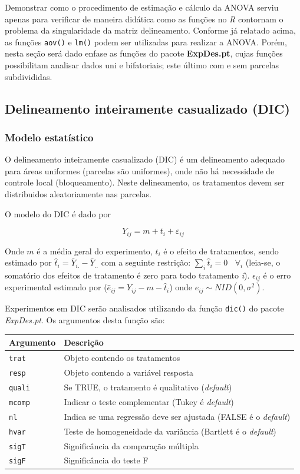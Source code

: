\documentclass[
]{book}
\numberwithin{equation}{section}
\newcommand{\indt}[1]{\index{#1|ST}}
\begin{document}
Demonstrar como o procedimento de estimação e cálculo da ANOVA serviu apenas para verificar de maneira didática como as funções no \emph{R} contornam o problema da singularidade da matriz delineamento. Conforme já relatado acima, as funções \texttt{aov()} e \texttt{lm()} podem ser utilizadas para realizar a ANOVA. Porém, nesta seção será dado enfase as funções do pacote \textbf{ExpDes.pt}, \indt{ExpDes} cujas funções possibilitam analisar dados uni e bifatoriais; este último com e sem parcelas subdivididas.

\hypertarget{delineamento-inteiramente-casualizado-dic}{%
\subsection{Delineamento inteiramente casualizado (DIC)}\label{delineamento-inteiramente-casualizado-dic}}

\hypertarget{modelo-estatuxedstico}{%
\subsubsection{Modelo estatístico}\label{modelo-estatuxedstico}}

O delineamento inteiramente casualizado (DIC) é um delineamento adequado para áreas uniformes (parcelas são uniformes), onde não há necessidade de controle local (bloqueamento). Neste delineamento, os tratamentos devem ser distribuidos aleatoriamente nas parcelas.

O modelo do DIC é dado por \indt{DIC}

\[
{Y_{ij}} = m + {t_i} + {\varepsilon _{ij}}
\]

Onde \(m\) é a média geral do experimento, \(t_i\) é o efeito de tratamentos, sendo estimado por \(\hat t_i = \bar Y_{i.} - \bar Y_{..}\) com a seguinte restrição: \(\sum_i \hat t_i = 0 ~~~~\forall_i\) (leia-se, o somatório dos efeitos de tratamento é zero para todo tratamento \emph{i}). \(\epsilon_{ij}\) é o erro experimental estimado por (\(\hat e_{ij} = Y_{ij} - m - \hat t_i\)) onde \({e_{ij}}\sim NID(0,{\sigma ^2})\).

Experimentos em DIC serão analisados utilizando da função \texttt{dic()} \indt{dic()} do pacote \emph{ExpDes.pt}. Os argumentos desta função são:

\begin{longtable}[]{@{}ll@{}}
\toprule
Argumento & Descrição\tabularnewline
\midrule
\endhead
\texttt{trat} & Objeto contendo os tratamentos\tabularnewline
\texttt{resp} & Objeto contendo a variável resposta\tabularnewline
\texttt{quali} & Se TRUE, o tratamento é qualitativo (\emph{default})\tabularnewline
\texttt{mcomp} & Indicar o teste complementar (Tukey é \emph{default})\tabularnewline
\texttt{nl} & Indica se uma regressão deve ser ajustada (FALSE é o \emph{default})\tabularnewline
\texttt{hvar} & Teste de homogeneidade da variância (Bartlett é o \emph{default})\tabularnewline
\texttt{sigT} & Significância da comparação múltipla\tabularnewline
\texttt{sigF} & Significância do teste F\tabularnewline
\bottomrule
\end{longtable}
\end{document}

